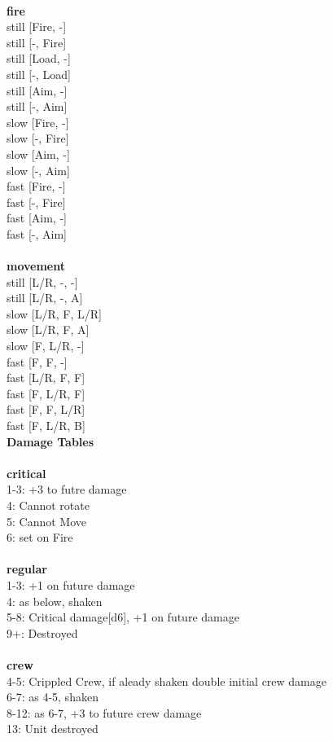 \ \\ {\bf fire } \\
still [Fire, -] \\
still [-, Fire] \\
still [Load, -] \\
still [-, Load] \\
still [Aim, -] \\
still [-, Aim] \\
slow [Fire, -] \\
slow [-, Fire] \\
slow [Aim, -] \\
slow [-, Aim] \\
fast [Fire, -] \\
fast [-, Fire] \\
fast [Aim, -] \\
fast [-, Aim] \\
\ \\ {\bf movement } \\
still [L/R, -, -] \\
still [L/R, -, A] \\
slow [L/R, F, L/R] \\
slow [L/R, F, A] \\
slow [F, L/R, -] \\
fast [F, F, -] \\
fast [L/R, F, F] \\
fast [F, L/R, F] \\
fast [F, F, L/R] \\
fast [F, L/R, B] \\


{\bf Damage Tables} \\
\ \\ {\bf critical } \\
1-3: +3 to futre damage \\
4: Cannot rotate \\
5: Cannot Move \\
6: set on Fire \\
\ \\ {\bf regular } \\
1-3: +1 on future damage \\
4: as below, shaken \\
5-8: Critical damage[d6], +1 on future damage \\
9+: Destroyed \\
\ \\ {\bf crew } \\
4-5: Crippled Crew, if aleady shaken double initial crew damage \\
6-7: as 4-5, shaken \\
8-12: as 6-7, +3 to future crew damage \\
13: Unit destroyed \\


